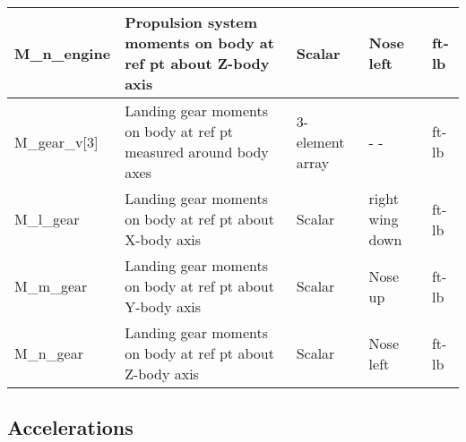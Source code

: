 \documentclass[10pt]{article}
\begin{document}
\begin{tabular}{|l|p{2.0in}|p{1.0in}|p{1.0in}|l|}
M\_n\_engine & Propulsion system moments on body at ref pt about Z-body axis & Scalar & Nose left & ft-lb \\
\hline
M\_gear\_v[3] & Landing gear moments on body at ref pt measured around body axes & 3-element array &          - - & ft-lb \\
M\_l\_gear & Landing gear moments on body at ref pt about X-body axis & Scalar & right wing down & ft-lb \\
M\_m\_gear & Landing gear moments on body at ref pt about Y-body axis & Scalar & Nose up & ft-lb \\
M\_n\_gear & Landing gear moments on body at ref pt about Z-body axis & Scalar & Nose left & ft-lb \\
\hline
\end{tabular}

\subsection{Accelerations}
\end{document}
